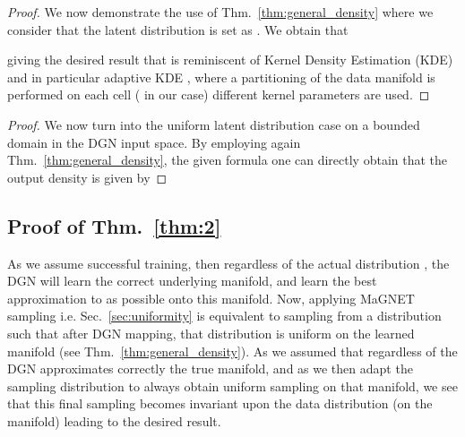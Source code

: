 \begin{proof}
We now demonstrate the use of Thm.~\ref{thm:general_density} where we consider that the latent distribution is set as  . 
We obtain that

giving the desired result that is reminiscent of Kernel Density Estimation (KDE) \citep{rosenblatt1956remarks} and in particular adaptive KDE \citep{breiman1977variable}, where a partitioning of the data manifold is performed on each cell ( in our case) different kernel parameters are used.
\end{proof}

\begin{proof}
We now turn into the uniform latent distribution case on a bounded domain  in the DGN input space. By employing again Thm.~\ref{thm:general_density}, the given formula one can directly obtain that the output density is given by 

\end{proof}



\subsection{Proof of Thm.~\ref{thm:2}}
\label{proof:thm2}

As we assume successful training, then regardless of the actual distribution , the DGN will learn the correct underlying manifold, and learn the best approximation to  as possible onto this manifold. Now, applying MaGNET sampling i.e. Sec.~\ref{sec:uniformity} is equivalent to sampling from a distribution  such that after DGN mapping, that distribution is uniform on the learned manifold (see Thm.~\ref{thm:general_density}). As we assumed that regardless of  the DGN approximates correctly the true manifold, and as we then adapt the sampling distribution  to always obtain uniform sampling on that manifold, we see that this final sampling becomes invariant upon the data distribution (on the manifold) leading to the desired result.



%
